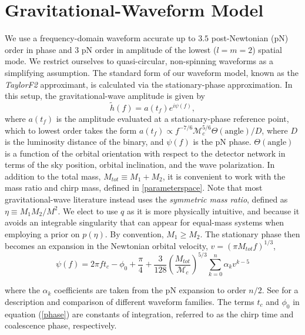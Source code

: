 \documentclass[11pt,a4paper]{emulateapj} 
\newcommand{\chmass}{\mathcal{M}_c}
\begin{document}
\section{Gravitational-Waveform Model}
\label{appendixWaveform}

We use a frequency-domain waveform accurate up to $3.5$ post-Newtonian
(pN) order in phase and 3 pN order in amplitude of the lowest ($l=m=2$) spatial mode.
  We restrict
ourselves to quasi-circular, non-spinning waveforms as a simplifying
assumption.  The standard form of our waveform model, known as the
\textit{TaylorF2} approximant, is calculated via the stationary-phase
approximation.  In this setup, the gravitational-wave amplitude is
given by
\begin{equation}
\tilde{h}(f) = a(t_f) e^{i \psi(f)},
\label{amplitude}
\end{equation}
where $a(t_f)$ is the amplitude evaluated at a stationary-phase
reference point, which to lowest order takes the form $a(t_f) \propto
f^{-7/6} \chmass^{5/6}\Theta(\text{angle})/D$, where $D$ is the
luminosity distance of the binary, and $\psi(f)$ is the pN phase.
$\Theta(\text{angle})$ is a function of the orbital orientation with
respect to the detector network in terms of the sky position, orbital
inclination, and the wave polarization.  In addition to the total
mass, $M_{tot}\equiv M_1+M_2$, it is convenient to work with the mass
ratio and chirp mass, defined in \ref{parameterspace}.
  Note that most gravitational-wave literature instead uses
  the \textit{symmetric mass ratio}, defined as $\eta \equiv M_1 M_2 /
  M^2$.  We elect to use $q$ as it is more physically intuitive, and
  because it avoids an integrable singularity that can appear for
  equal-mass systems when employing a prior on $p(\eta)$.  
     By convention, $M_1 \geq M_2$.  The stationary phase then
becomes an expansion in the Newtonian orbital velocity, $v=(\pi
M_{tot} f)^{1/3}$,
\begin{equation}
\psi(f) = 2 \pi f t_c - \phi_0 + \frac{\pi}{4} +
\frac{3}{128}\left(\frac{M_{tot}}{\chmass}\right)^{5/3}\sum^{n}_{k=0}\alpha_{k}v^{k-5}
\label{phase}
\end{equation}

\noindent where the $\alpha_{k}$ coefficients are taken from the pN
expansion to order $n/2$.  See \cite{BuonannoWaveform} for a
description and comparison of different waveform families.  The terms
$t_c$ and $\phi_0$ in equation (\ref{phase}) are constants of
integration, referred to as the chirp time and coalescence phase,
respectively.
\end{document}
